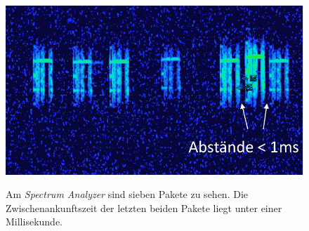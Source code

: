 \begin{figure}[bth]
        \myfloatalign
        {\includegraphics[width=0.6\linewidth]{gfx/Problem_Verarbeitung}} 
        \caption[Pakete mit kurzen Abstand]{Am \emph{Spectrum Analyzer} sind sieben Pakete zu sehen. Die Zwischenankunftszeit der letzten beiden Pakete liegt unter einer Millisekunde.}\label{fig:spec_pakete_mit_kurzem_abstand}
\end{figure}





